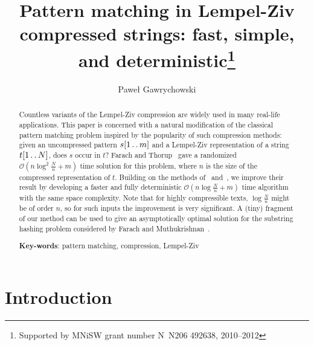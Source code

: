 \documentclass[runningheads]{llncs}
\newcommand{\twodots}{\mathinner{\ldotp\ldotp}}
\begin{document}
\title{Pattern matching in Lempel-Ziv compressed strings: fast, simple, and deterministic\thanks{Supported by MNiSW grant number N~N206 492638, 2010--2012}}

\author{Pawe\l{} Gawrychowski}

\maketitle
\begin{abstract}
Countless variants of the Lempel-Ziv compression are widely used in many real-life applications. This paper is concerned with a natural modification of the classical pattern matching problem inspired by the popularity of such compression methods: given an uncompressed pattern $s[1\twodots m]$ and a Lempel-Ziv representation of a string $t[1\twodots N]$, does $s$ occur in $t$? Farach and Thorup~\cite{Farach} gave a randomized $\mathcal{O}(n\log^2\frac{N}{n}+m)$ time solution for this problem, where $n$ is the size of the compressed representation of $t$. Building on the methods of~\cite{CharikarApproximation} and~\cite{GawrychowskiLZW}, we improve their result by developing a faster and fully deterministic $\mathcal{O}(n\log\frac{N}{n}+m)$ time algorithm with the same space complexity. Note that for highly compressible texts, $\log\frac{N}{n}$ might be of order $n$, so for such inputs the improvement is very significant. A (tiny) fragment of our method can be used to give an asymptotically optimal solution for the substring hashing problem considered by Farach and Muthukrishnan~\cite{FarachHashing}.

\textbf{Key-words}: pattern matching, compression, Lempel-Ziv
\end{abstract}

\section{Introduction}
\end{document}
